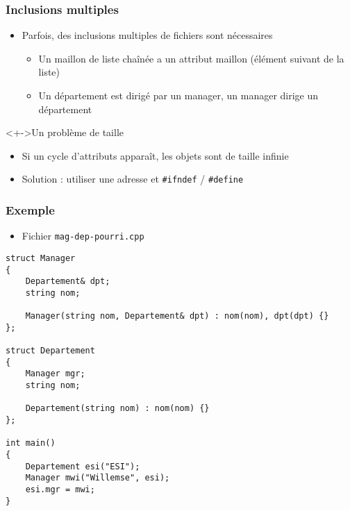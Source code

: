 \begin{frame}
\frametitle{Inclusions multiples}
\begin{itemize}[<+->]
\item Parfois, des inclusions multiples de fichiers sont nécessaires
	\begin{itemize}
	\item Un maillon de liste chaînée a un attribut maillon (élément suivant de la liste)
	\item Un département est dirigé par un manager, un manager dirige un département
	\end{itemize}
\end{itemize}
\begin{alertblock}<+->{Un problème de taille}
	\begin{itemize}[<+->]
	\item Si un cycle d'attributs apparaît, les objets sont de taille infinie
	\end{itemize}
\end{alertblock}
\begin{itemize}[<+->]
\item Solution : utiliser une adresse et \texttt{\#ifndef} / \texttt{\#define}
\end{itemize}
\end{frame}

\begin{frame}[containsverbatim]
\frametitle{Exemple}
\begin{itemize}
\item Fichier \texttt{mag-dep-pourri.cpp}
\end{itemize}
\begin{lstlisting}
struct Manager
{
	Departement& dpt;
	string nom;
	
	Manager(string nom, Departement& dpt) : nom(nom), dpt(dpt) {}
};

struct Departement
{
	Manager mgr;
	string nom;

	Departement(string nom) : nom(nom) {}
};

int main()
{
	Departement esi("ESI");
	Manager mwi("Willemse", esi);
	esi.mgr = mwi;
}
\end{lstlisting}
\end{frame}

